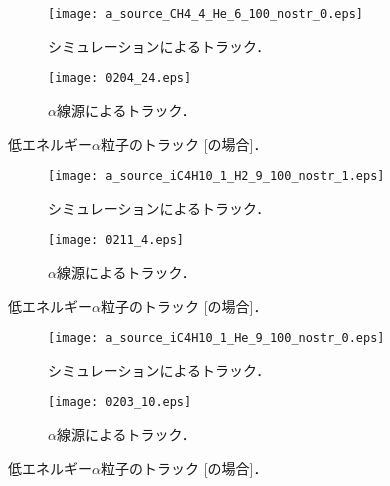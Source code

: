 \documentclass[../master]{subfiles}
\begin{document}
\begin{figure}
  \centering
  \begin{subfigure}{0.48\columnwidth}
    \centering
    \texttt{[image: a\_source\_CH4\_4\_He\_6\_100\_nostr\_0.eps]}
    \caption{シミュレーションによるトラック．}
  \end{subfigure}
  \begin{subfigure}{0.48\columnwidth}
    \centering
    \texttt{[image: 0204\_24.eps]}
    \caption{$\alpha$線源によるトラック．}
  \end{subfigure}
  \caption{低エネルギー$\alpha$粒子のトラック [\MethaneHerium の場合]．}
  \label{fig::track_ch4_he_loss}
\end{figure}
\begin{figure}
  \centering
  \begin{subfigure}{0.48\columnwidth}
    \centering
    \texttt{[image: a\_source\_iC4H10\_1\_H2\_9\_100\_nostr\_1.eps]}
    \caption{シミュレーションによるトラック．}
  \end{subfigure}
  \begin{subfigure}{0.48\columnwidth}
    \centering
    \texttt{[image: 0211\_4.eps]}
    \caption{$\alpha$線源によるトラック．}
  \end{subfigure}
  \caption{低エネルギー$\alpha$粒子のトラック [\isoButaneHydro の場合]．}
  \label{fig::track_ic4h10_h2_loss}
\end{figure}
\begin{figure}
  \centering
  \begin{subfigure}{0.48\columnwidth}
    \centering
    \texttt{[image: a\_source\_iC4H10\_1\_He\_9\_100\_nostr\_0.eps]}
    \caption{シミュレーションによるトラック．}
  \end{subfigure}
  \begin{subfigure}{0.48\columnwidth}
    \centering
    \texttt{[image: 0203\_10.eps]}
    \caption{$\alpha$線源によるトラック．}
  \end{subfigure}
  \caption{低エネルギー$\alpha$粒子のトラック [\isoButaneHerium の場合]．}
  \label{fig::track_ic4h10_he_loss}
\end{figure}
\end{document}
